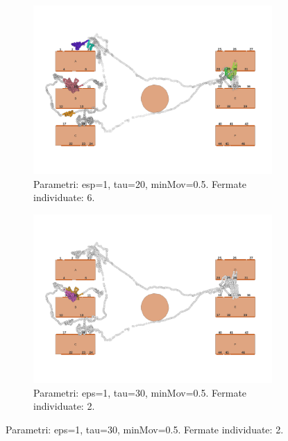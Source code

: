 \documentclass[12pt]{article}
\begin{document}
\begin{figure}[htb!]
    \centering
    \begin{subfigure}[b]{0.45\textwidth}
        \centering
        \includegraphics[width=\textwidth]{images/stop_points_p57_SOC_eps1_tau20_minMov05.png}
        \caption{Parametri: esp=1, tau=20, minMov=0.5. Fermate individuate: 6.}
        \label{stop_points_p57_SOC_eps1_tau20_minMov05}
    \end{subfigure}
    \hfill
    \begin{subfigure}[b]{0.45\textwidth}
        \centering
        \includegraphics[width=\textwidth]{images/stop_points_p57_SOC_eps1_tau30_minMov05.png}
        \caption{Parametri: eps=1, tau=30, minMov=0.5. Fermate individuate: 2.}
        \label{stop_points_p57_SOC_eps1_tau30_minMov05}
    \end{subfigure}

\end{figure}
\end{document}
